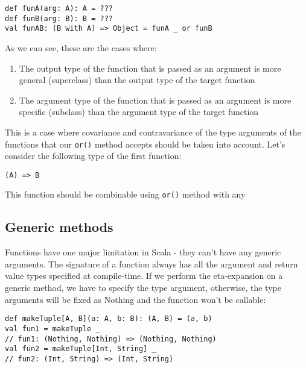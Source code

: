 \begin{lstlisting}
def funA(arg: A): A = ???
def funB(arg: B): B = ???
val funAB: (B with A) => Object = funA _ or funB
\end{lstlisting}


As we can see, these are the cases where:

\begin{enumerate}
	\item The output type of the function that is passed as an argument is more general (superclass) than the output type of the target function
	\item The argument type of the function that is passed as an argument is more specific (subclass) than the argument type of the target function
\end{enumerate}

This is a case where covariance and contravariance of the type arguments of the functions that our \lstinline|or()| method accepts should be taken into account. Let's consider the following type of the first function:

\lstset{style=Scala}
\begin{lstlisting}
(A) => B
\end{lstlisting}

This function should be combinable using \lstinline|or()| method with any 

\subsection{Generic methods}



Functions have one major limitation in Scala - they can't have any generic arguments. The signature of a function always has all the argument and return value types specified at compile-time. If we perform the eta-expansion on a generic method, we have to specify the type argument, otherwise, the type arguments will be fixed as Nothing and the function won't be callable:

\lstset{style=Scala}
\begin{lstlisting}
def makeTuple[A, B](a: A, b: B): (A, B) = (a, b)
val fun1 = makeTuple _
// fun1: (Nothing, Nothing) => (Nothing, Nothing)
val fun2 = makeTuple[Int, String] _
// fun2: (Int, String) => (Int, String)
\end{lstlisting}

